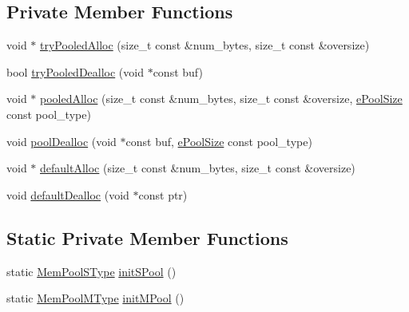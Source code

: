 \subsection*{Private Member Functions}
\begin{DoxyCompactItemize}
\item 
void $\ast$ \hyperlink{structvt_1_1pool_1_1_pool_abd5f079910c28493ad3b0d5a9469f00a}{try\+Pooled\+Alloc} (size\+\_\+t const \&num\+\_\+bytes, size\+\_\+t const \&oversize)
\item 
bool \hyperlink{structvt_1_1pool_1_1_pool_adf32f4660575880101522e5d6b640edd}{try\+Pooled\+Dealloc} (void $\ast$const buf)
\item 
void $\ast$ \hyperlink{structvt_1_1pool_1_1_pool_a8a6ff684a26b2229cbf263e99a1bc2ee}{pooled\+Alloc} (size\+\_\+t const \&num\+\_\+bytes, size\+\_\+t const \&oversize, \hyperlink{structvt_1_1pool_1_1_pool_ace8d36439e5e599a8ee68b2f1a6a6b28}{e\+Pool\+Size} const pool\+\_\+type)
\item 
void \hyperlink{structvt_1_1pool_1_1_pool_aa9ae08727c21035461d6f60b93ea19ab}{pool\+Dealloc} (void $\ast$const buf, \hyperlink{structvt_1_1pool_1_1_pool_ace8d36439e5e599a8ee68b2f1a6a6b28}{e\+Pool\+Size} const pool\+\_\+type)
\item 
void $\ast$ \hyperlink{structvt_1_1pool_1_1_pool_ad9eb4c0efa76dc46487e23e265554943}{default\+Alloc} (size\+\_\+t const \&num\+\_\+bytes, size\+\_\+t const \&oversize)
\item 
void \hyperlink{structvt_1_1pool_1_1_pool_a8d8654019bf80cd274bea1797645db37}{default\+Dealloc} (void $\ast$const ptr)
\end{DoxyCompactItemize}
\subsection*{Static Private Member Functions}
\begin{DoxyCompactItemize}
\item 
static \hyperlink{structvt_1_1pool_1_1_pool_a9f94985824d12c43357cfe50eaaefd38}{Mem\+Pool\+S\+Type} \hyperlink{structvt_1_1pool_1_1_pool_a833da3cd4d410ba607b6e7b000810882}{init\+S\+Pool} ()
\item 
static \hyperlink{structvt_1_1pool_1_1_pool_a8a201b9a843e47cd4e7b568a8e4483da}{Mem\+Pool\+M\+Type} \hyperlink{structvt_1_1pool_1_1_pool_ab768c364b348107112f960ce0704565d}{init\+M\+Pool} ()
\end{DoxyCompactItemize}
